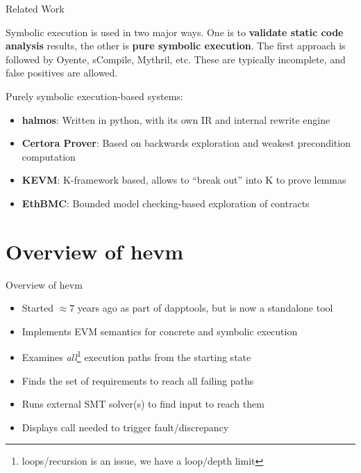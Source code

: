 \documentclass[aspectratio=169]{beamer}
\begin{document}
\begin{frame}{Related Work}

Symbolic execution is used in two major ways. One is to \textbf{validate static code analysis} results, the other is \textbf{pure symbolic execution}. The first approach is followed by Oyente, sCompile, Mythril, etc. These are typically incomplete, and false positives are allowed.

\bigskip

Purely symbolic execution-based systems:
\begin{itemize}
\item \textbf{halmos}: Written in python, with its own IR and internal rewrite engine
\item \textbf{Certora Prover}: Based on backwards exploration and weakest precondition computation
\item \textbf{KEVM}: K-framework based, allows to ``break out'' into K to prove lemmas
\item \textbf{EthBMC}: Bounded model checking-based exploration of contracts
\end{itemize}
\end{frame}


\section{Overview of hevm}
\begin{frame}{Overview of hevm}
\begin{itemize}
\item Started $\approx7$ years ago as part of dapptools, but is now a standalone tool
\item Implements EVM semantics for concrete and symbolic execution
\item Examines \emph{all}\footnote{loops/recursion is an issue, we have a loop/depth limit} execution paths from the starting state
\item Finds the set of requirements to reach all failing paths
\item Runs external SMT solver(s) to find input to reach them
\item Displays call needed to trigger fault/discrepancy
\end{itemize}
\end{frame}



%
%
%
\end{document}
